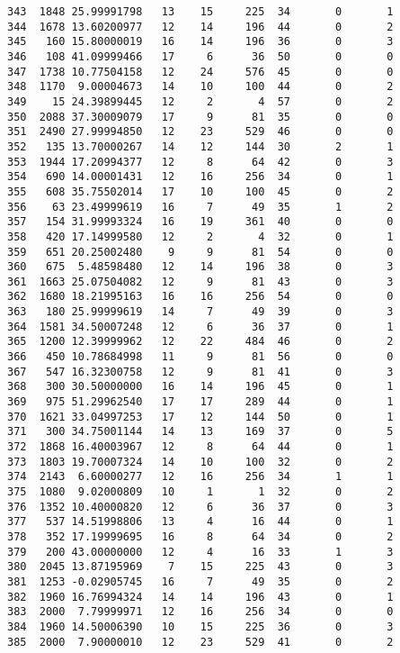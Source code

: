 \documentclass[
  letterpaper,
  DIV=11,
  numbers=noendperiod]{scrreprt}
\begin{document}
\begin{verbatim}
343  1848 25.99991798   13    15     225  34       0       1
344  1678 13.60200977   12    14     196  44       0       2
345   160 15.80000019   16    14     196  36       0       3
346   108 41.09999466   17     6      36  50       0       0
347  1738 10.77504158   12    24     576  45       0       0
348  1170  9.00004673   14    10     100  44       0       2
349    15 24.39899445   12     2       4  57       0       2
350  2088 37.30009079   17     9      81  35       0       0
351  2490 27.99994850   12    23     529  46       0       0
352   135 13.70000267   14    12     144  30       2       1
353  1944 17.20994377   12     8      64  42       0       3
354   690 14.00001431   12    16     256  34       0       1
355   608 35.75502014   17    10     100  45       0       2
356    63 23.49999619   16     7      49  35       1       2
357   154 31.99993324   16    19     361  40       0       0
358   420 17.14999580   12     2       4  32       0       1
359   651 20.25002480    9     9      81  54       0       0
360   675  5.48598480   12    14     196  38       0       3
361  1663 25.07504082   12     9      81  43       0       3
362  1680 18.21995163   16    16     256  54       0       0
363   180 25.99999619   14     7      49  39       0       3
364  1581 34.50007248   12     6      36  37       0       1
365  1200 12.39999962   12    22     484  46       0       2
366   450 10.78684998   11     9      81  56       0       0
367   547 16.32300758   12     9      81  41       0       3
368   300 30.50000000   16    14     196  45       0       1
369   975 51.29962540   17    17     289  44       0       1
370  1621 33.04997253   17    12     144  50       0       1
371   300 34.75001144   14    13     169  37       0       5
372  1868 16.40003967   12     8      64  44       0       1
373  1803 19.70007324   14    10     100  32       0       2
374  2143  6.60000277   12    16     256  34       1       1
375  1080  9.02000809   10     1       1  32       0       2
376  1352 10.40000820   12     6      36  37       0       3
377   537 14.51998806   13     4      16  44       0       1
378   352 17.19999695   16     8      64  34       0       2
379   200 43.00000000   12     4      16  33       1       3
380  2045 13.87195969    7    15     225  43       0       3
381  1253 -0.02905745   16     7      49  35       0       2
382  1960 16.76994324   14    14     196  43       0       1
383  2000  7.79999971   12    16     256  34       0       0
384  1960 14.50006390   10    15     225  36       0       3
385  2000  7.90000010   12    23     529  41       0       2

\end{verbatim}
\end{document}
